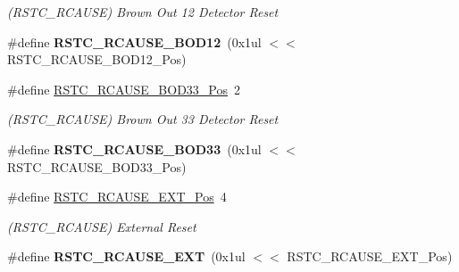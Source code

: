\begin{DoxyCompactItemize}
\begin{DoxyCompactList}\small\item\em (R\+S\+T\+C\+\_\+\+R\+C\+A\+U\+S\+E) Brown Out 12 Detector Reset \end{DoxyCompactList}\item 
\hypertarget{group___s_a_m_l21___r_s_t_c_gac8f49ec625ec182c66f27a0125208f25}{}\#define {\bfseries R\+S\+T\+C\+\_\+\+R\+C\+A\+U\+S\+E\+\_\+\+B\+O\+D12}~(0x1ul $<$$<$ R\+S\+T\+C\+\_\+\+R\+C\+A\+U\+S\+E\+\_\+\+B\+O\+D12\+\_\+\+Pos)\label{group___s_a_m_l21___r_s_t_c_gac8f49ec625ec182c66f27a0125208f25}

\item 
\hypertarget{group___s_a_m_l21___r_s_t_c_gab638f6e80da0978551cad28527dca20b}{}\#define \hyperlink{group___s_a_m_l21___r_s_t_c_gab638f6e80da0978551cad28527dca20b}{R\+S\+T\+C\+\_\+\+R\+C\+A\+U\+S\+E\+\_\+\+B\+O\+D33\+\_\+\+Pos}~2\label{group___s_a_m_l21___r_s_t_c_gab638f6e80da0978551cad28527dca20b}

\begin{DoxyCompactList}\small\item\em (R\+S\+T\+C\+\_\+\+R\+C\+A\+U\+S\+E) Brown Out 33 Detector Reset \end{DoxyCompactList}\item 
\hypertarget{group___s_a_m_l21___r_s_t_c_ga6a02bc1d771f651257dfde2275da788e}{}\#define {\bfseries R\+S\+T\+C\+\_\+\+R\+C\+A\+U\+S\+E\+\_\+\+B\+O\+D33}~(0x1ul $<$$<$ R\+S\+T\+C\+\_\+\+R\+C\+A\+U\+S\+E\+\_\+\+B\+O\+D33\+\_\+\+Pos)\label{group___s_a_m_l21___r_s_t_c_ga6a02bc1d771f651257dfde2275da788e}

\item 
\hypertarget{group___s_a_m_l21___r_s_t_c_ga79c351d53a6ad8af54351cd87430b787}{}\#define \hyperlink{group___s_a_m_l21___r_s_t_c_ga79c351d53a6ad8af54351cd87430b787}{R\+S\+T\+C\+\_\+\+R\+C\+A\+U\+S\+E\+\_\+\+E\+X\+T\+\_\+\+Pos}~4\label{group___s_a_m_l21___r_s_t_c_ga79c351d53a6ad8af54351cd87430b787}

\begin{DoxyCompactList}\small\item\em (R\+S\+T\+C\+\_\+\+R\+C\+A\+U\+S\+E) External Reset \end{DoxyCompactList}\item 
\hypertarget{group___s_a_m_l21___r_s_t_c_ga8d59ce0d634311e9e0c7167765c3a60a}{}\#define {\bfseries R\+S\+T\+C\+\_\+\+R\+C\+A\+U\+S\+E\+\_\+\+E\+X\+T}~(0x1ul $<$$<$ R\+S\+T\+C\+\_\+\+R\+C\+A\+U\+S\+E\+\_\+\+E\+X\+T\+\_\+\+Pos)\label{group___s_a_m_l21___r_s_t_c_ga8d59ce0d634311e9e0c7167765c3a60a}


\end{DoxyCompactItemize}
